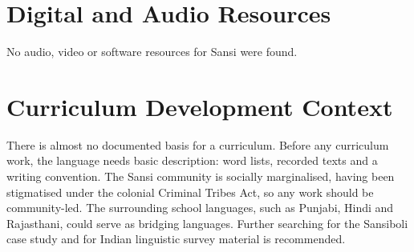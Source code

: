 \documentclass[12pt]{article}
\begin{document}
\section{Digital and Audio Resources}
No audio, video or software resources for Sansi were found.

\section{Curriculum Development Context}
There is almost no documented basis for a curriculum. Before any curriculum work, the language needs basic description: word lists, recorded texts and a writing convention. The Sansi community is socially marginalised, having been stigmatised under the colonial Criminal Tribes Act, so any work should be community-led. The surrounding school languages, such as Punjabi, Hindi and Rajasthani, could serve as bridging languages. Further searching for the Sansiboli case study and for Indian linguistic survey material is recommended.
\end{document}
